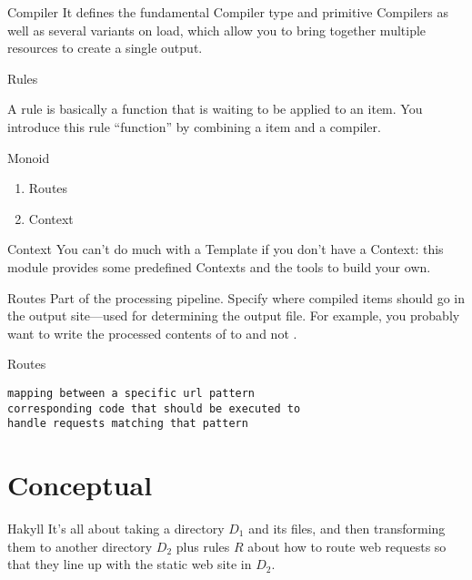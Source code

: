 \documentclass[openany, 12pt]{article}
\begin{document}
\begin{definition}{Compiler}{}
	It defines the fundamental Compiler type and primitive Compilers as well as
	several variants on load, which allow you to bring together multiple
	resources to create a single output.
\end{definition}

\begin{intuition}{Rules}{}

	A rule is basically a function that is waiting to be applied to an item.
	You introduce this rule ``function'' by combining a item and a compiler.
\end{intuition}

\begin{definition}{Monoid}{}
	\begin{multicols}{2}
		\begin{enumerate}[label = {(\arabic*)}]
			\item Routes
			\item Context
		\end{enumerate}
	\end{multicols}
\end{definition}

\begin{definition}{Context}{}
	You can’t do much with a Template if you don’t have a Context: this module
	provides some predefined Contexts and the tools to build your own.
\end{definition}

\begin{definition}{Routes}{}
	Part of the  processing pipeline.
	Specify where compiled items should go in the output site---used for
	determining the output file. For example, you probably want to write the
	processed contents of  to 
	and not .
\end{definition}

\begin{intuition}{Routes}{}
	\begin{verbatim}
mapping between a specific url pattern
corresponding code that should be executed to
handle requests matching that pattern
	\end{verbatim}
\end{intuition}

\section{Conceptual}
\begin{intuition}{Hakyll}{}
	It's all about taking a directory $D_1$ and its files, and then
	transforming them to another directory $D_2$ plus rules $R$ about how to
	route web requests so that they line up with the static web site in $D_2$.
\end{intuition}
\end{document}
